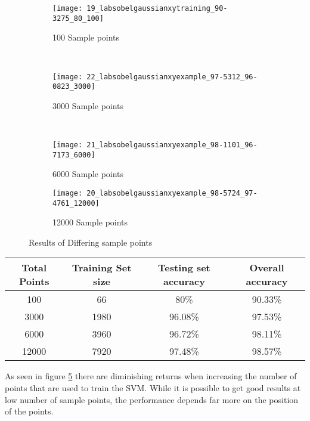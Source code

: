 \begin{figure}[h]
        \centering
        \begin{subfigure}[b]{0.3\textwidth}
                \centering
                \texttt{[image: 19\_labsobelgaussianxytraining\_90-3275\_80\_100]}
                \caption{100 Sample points}
                \label{fig:19_labsobelgaussianxytraining_90.3275_80_100}
        \end{subfigure}%
        ~ %
        \begin{subfigure}[b]{0.3\textwidth}
                \centering

                \texttt{[image: 22\_labsobelgaussianxyexample\_97-5312\_96-0823\_3000]}
                \caption{3000 Sample points}
                \label{fig:22_labsobelgaussianxyexample_97.5312_96.0823_3000}     
        \end{subfigure}
        ~
        \begin{subfigure}[b]{0.3\textwidth}
                \centering

                \texttt{[image: 21\_labsobelgaussianxyexample\_98-1101\_96-7173\_6000]}
                \caption{6000 Sample points}
                \label{fig:21_labsobelgaussianxyexample_98.1101_96.7173_6000}     
        \end{subfigure}
        \begin{subfigure}[b]{0.3\textwidth}
                \centering

                \texttt{[image: 20\_labsobelgaussianxyexample\_98-5724\_97-4761\_12000]}
                \caption{12000 Sample points}
                \label{fig:20_labsobelgaussianxyexample_98.5724_97.4761_12000}     
        \end{subfigure}
        \caption{Results of Differing sample points}\label{fig:samplepoints}
\end{figure}

\begin{center}
  \begin{tabular}{| c | c | c | c | }
    \hline
    \textbf{Total Points} & \textbf{Training Set size} & \textbf{Testing set accuracy} & \textbf{Overall accuracy} \\ \hline
    100 & 66 & 80\% & 90.33\% \\ \hline
    3000 & 1980 & 96.08\% & 97.53\% \\ \hline
    6000 & 3960 & 96.72\% & 98.11\% \\ \hline
    12000 & 7920 & 97.48\% & 98.57\% \\ 
    \hline
  \end{tabular}
\end{center}

As seen in figure \ref{fig:samplepoints} there are diminishing returns when increasing the number of points that are used to train the SVM. While it is possible to get good results at low number of sample points, the performance depends far more on the position of the points.